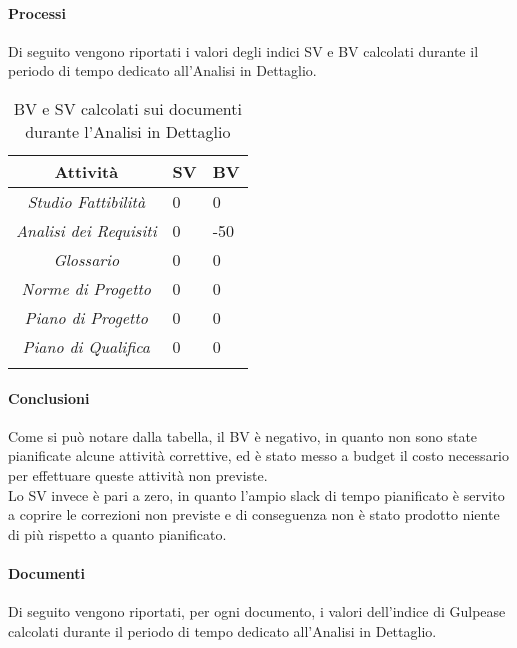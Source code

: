 \paragraph{Processi}
Di seguito vengono riportati i valori degli indici SV e BV calcolati durante il periodo di tempo dedicato all'Analisi in Dettaglio.
\begin{longtable}{|c|p{3cm}|p{3cm}|}
\toprule
\textbf{Attività} & \textbf{SV} & \textbf{BV} \\


\midrule
\emph{Studio Fattibilità} & 0 & 0 \\
\midrule
\emph{Analisi dei Requisiti} & 0 & -50\\
\midrule
\emph{Glossario} & 0  & 0\\
\midrule
\emph{Norme di Progetto} & 0 & 0\\
\midrule
\emph{Piano di Progetto} & 0 & 0\\
\midrule
\emph{Piano di Qualifica} & 0 & 0\\
\bottomrule
\caption{BV e SV calcolati sui documenti durante l'Analisi in Dettaglio}
\label{tab:changelog}
\end{longtable}

\paragraph{Conclusioni}
Come si può notare dalla tabella, il BV è negativo, in quanto non sono state pianificate alcune attività correttive, ed è stato messo a budget il costo necessario per effettuare queste attività non previste.\\
Lo SV invece è pari a zero, in quanto l'ampio slack di tempo pianificato è servito a coprire le correzioni non previste e di conseguenza non è stato prodotto niente di più rispetto a quanto pianificato.
\paragraph{Documenti}
Di seguito vengono riportati, per ogni documento, i valori dell'indice di Gulpease calcolati durante il periodo di tempo dedicato all'Analisi in Dettaglio.

